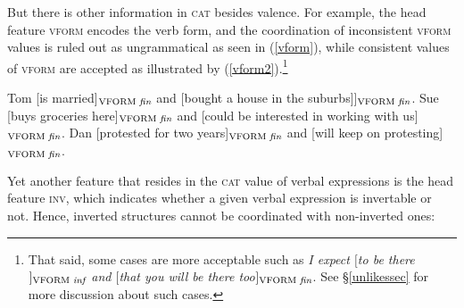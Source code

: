 \documentclass[output=paper]{langsci/langscibook}
\begin{document}
But there is other information in \textsc{cat} besides valence. For example, the head feature  \textsc{vform}  encodes the verb form, and the coordination of inconsistent \textsc{vform} values is   ruled out as ungrammatical as seen
 in (\ref{vform}), while  consistent values of \textsc{vform} are accepted  as illustrated by (\ref{vform2}).\footnote{That said, some cases are more acceptable such as 
{\it I expect $[$to be there$]_{\textup{\scriptsize VFORM} \,\, \text{\it inf}}$ and 
$[$that you will be there too$]_{\textup{\scriptsize VFORM} \,\, \text{\it fin}}$}. See \S\ref{unlikessec} for
more discussion about such cases.}



\begin{exe}
\ex
\begin{xlista}
 \end{xlista} \label{vform}
\end{exe}



\begin{exe}
\ex \begin{xlista}
  \ex Tom [is married]$_{\textup{\scriptsize VFORM} \,\, \text{\it fin}}$ and
                   [bought  a house in the suburbs]]$_{\textup{\scriptsize VFORM} \,\, \text{\it fin}}$.
   \ex Sue [buys groceries here]$_{\textup{\scriptsize VFORM} \,\, \text{\it fin}}$ and
                   [could be interested in working with us]$_{\textup{\scriptsize VFORM} \,\, \text{\it fin}}$.
   \ex Dan [protested for two years]$_{\textup{\scriptsize VFORM} \,\, \text{\it fin}}$ and
                   [will keep on protesting]$_{\textup{\scriptsize VFORM} \,\, \text{\it fin}}$.
\end{xlista}\label{vform2}
\end{exe}

Yet another feature that resides in the \textsc{cat} value of verbal expressions is the head feature \textsc{inv}, which indicates whether a given verbal expression is invertable or not. Hence, inverted structures cannot be coordinated with non-inverted ones:


\begin{exe}
\ex
\begin{xlista}
\ex[*] {[Sue has sung in public]$_{\textup{\scriptsize INV} -}$ and [has Kim tap-danced$_{\textup{\scriptsize INV} +}$.}
\end{xlista}
\end{exe}
\end{document}
